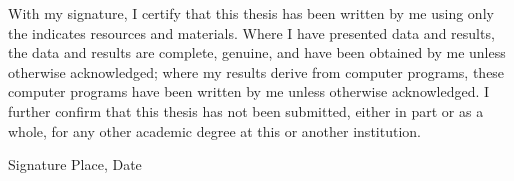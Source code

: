   \newpage
  \thispagestyle{empty}

  With my signature, I certify that this thesis has been written by me
  using only the indicates resources and materials. Where I have
  presented data and results, the data and results are complete,
  genuine, and have been obtained by me unless otherwise acknowledged;
  where my results derive from computer programs, these computer
  programs have been written by me unless otherwise acknowledged. I
  further confirm that this thesis has not been submitted, either in
  part or as a whole, for any other academic degree at this or another
  institution.

  \vspace{20mm}

  Signature \hfill Place, Date

 